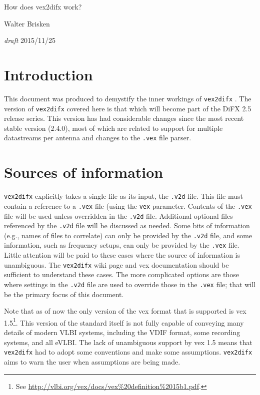 \documentclass[12pt]{article}
\begin{document}
\newcommand{\vexdifx}{{\tt vex2difx} }
\newcommand{\vd}{{\tt .v2d} }
\newcommand{\vx}{{\tt .vex} }
\newcommand{\defname}{{\em def name} }
\newcommand{\fs}{{\tt /}}
\newcommand{\hy}{{\tt -}}
\newcommand{\us}{{\tt \_}}

\begin{center}
{\Large How does vex2difx work?}

\vspace{10pt}
Walter Brisken

\vspace{10pt}
{\em draft} 2015/11/25
\end{center}


\section{Introduction}

This document was produced to demystify the inner workings of \vexdifx.
The version of \vexdifx covered here is that which will become part of the DiFX 2.5 release series.
This version has had considerable changes since the most recent stable version (2.4.0), most of which are related to support for multiple datastreams per antenna and changes to the \vx file parser.

\section{Sources of information}

\vexdifx explicitly takes a single file as its input, the \vd file.
This file must contain a reference to a \vx file (using the {\tt vex} parameter.
Contents of the {\tt .vex} file will be used unless overridden in the {\tt .v2d} file.
Additional optional files referenced by the {\tt .v2d} file will be discussed as needed.
Some bits of information (e.g., names of files to correlate) can only be provided by the \vd file, and some information, such as frequency setups, can only be provided by the \vx file.
Little attention will be paid to these cases where the source of information is unambiguous.
The \vexdifx wiki page and vex documentation should be sufficient to understand these cases.
The more complicated options are those where settings in the \vd file are used to override those in the \vx file; that will be the primary focus of this document.

Note that as of now the only version of the vex format that is supported is vex 1.5\footnote{See \url{http://vlbi.org/vex/docs/vex\%20definition\%2015b1.pdf}.}.
This version of the standard itself is not fully capable of conveying many details of modern VLBI systems, including the VDIF format, some recording systems, and all eVLBI.
The lack of unambiguous support by vex 1.5 means that \vexdifx had to adopt some conventions and make some assumptions.
\vexdifx aims to warn the user when assumptions are being made.
\end{document}
